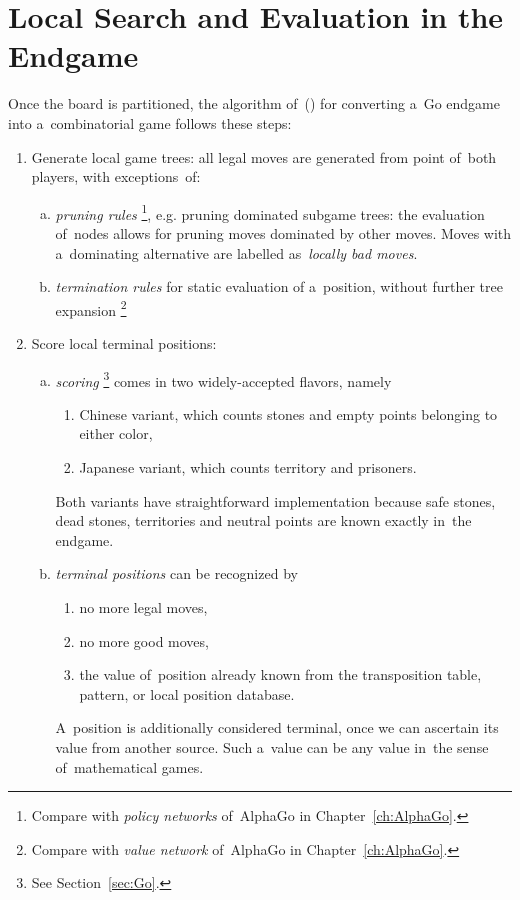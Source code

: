 \section{Local Search and Evaluation in the Endgame}
Once the board is partitioned, the algorithm of~(\cite{Muller1995computer}) for converting a~Go endgame into a~combinatorial game follows these steps:
\begin{enumerate}
  \item Generate local game trees:
    all legal moves are generated from point of~both players, with exceptions~of:
    \begin{enumerate}[(a)]
      \item \emph{pruning rules}%
        \footnote{Compare with \emph{policy networks} of~AlphaGo in Chapter~\ref{ch:AlphaGo}.},
        e.g. pruning dominated subgame trees:
        the evaluation of~nodes allows for pruning moves dominated by other moves.
        Moves with a~dominating alternative are labelled as~\emph{locally bad moves}.

      \item \emph{termination rules} for static evaluation of a~position, without further tree expansion%
        \footnote{Compare with \emph{value network} of~AlphaGo in Chapter~\ref{ch:AlphaGo}.}
    \end{enumerate}

  \item Score local terminal positions:
    \begin{enumerate}[(a)]
      \item \emph{scoring}%
        \footnote{See Section~\ref{sec:Go}.}
        comes in two widely-accepted flavors, namely
        \begin{enumerate}[$\diamondsuit$]
          \item Chinese variant, which counts stones and empty points belonging to either color,
          \item Japanese variant, which counts territory and prisoners.
        \end{enumerate}
        Both variants have straightforward implementation because safe stones, dead stones, territories and neutral points are known exactly in~the endgame.

      \item \emph{terminal positions} can be recognized by
        \begin{enumerate}[$\diamondsuit$]
          \item no more legal moves,
          \item no more good moves,
          \item the value of~position already known from the transposition table, pattern, or local position database.
        \end{enumerate}
        A~position is additionally considered terminal, once we can ascertain its value from another source.
        Such a~value can be any value in~the sense of~mathematical games.


\end{enumerate}
\end{enumerate}
